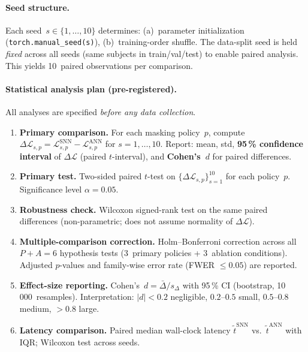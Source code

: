 \documentclass[11pt,a4paper]{article}
\begin{document}
\paragraph{Seed structure.}
Each seed~$s \in \{1, \dots, 10\}$ determines:
(a)~parameter initialization (\texttt{torch.manual\_seed(s)}),
(b)~training-order shuffle.
The data-split seed is held \emph{fixed} across all seeds
(same subjects in train/val/test) to enable paired analysis.
This yields 10~paired observations per comparison.

\paragraph{Statistical analysis plan (pre-registered).}
\label{par:stat-plan}
All analyses are specified \emph{before any data collection}.

\begin{enumerate}[nosep,label=\textbf{S\arabic*.}]
\item \textbf{Primary comparison.}
  For each masking policy~$p$, compute
  $\Delta\mathcal{L}_{s,p}
   = \mathcal{L}_{s,p}^{\text{SNN}} - \mathcal{L}_{s,p}^{\text{ANN}}$
  for $s = 1,\dots,10$.
  Report: mean, std, \textbf{95\,\% confidence interval} of
  $\Delta\mathcal{L}$ (paired $t$-interval), and
  \textbf{Cohen's~$d$} for paired differences.
\item \textbf{Primary test.}
  Two-sided paired $t$-test on $\{\Delta\mathcal{L}_{s,p}\}_{s=1}^{10}$
  for each policy~$p$.
  Significance level $\alpha = 0.05$.
\item \textbf{Robustness check.}
  Wilcoxon signed-rank test on the same paired differences
  (non-parametric; does not assume normality of $\Delta\mathcal{L}$).
\item \textbf{Multiple-comparison correction.}
  Holm--Bonferroni correction across all $P + A = 6$ hypothesis tests
  (3~primary policies + 3~ablation conditions).
  Adjusted $p$-values and family-wise error rate (FWER $\leq 0.05$)
  are reported.
\item \textbf{Effect-size reporting.}
  Cohen's~$d = \bar{\Delta} / s_{\Delta}$ with 95\,\% CI
  (bootstrap, 10\,000~resamples).
  Interpretation: $|d| < 0.2$ negligible, $0.2$--$0.5$ small,
  $0.5$--$0.8$ medium, $> 0.8$ large.
\item \textbf{Latency comparison.}
  Paired median wall-clock latency $\tilde{t}^{\text{SNN}}$ vs.\
  $\tilde{t}^{\text{ANN}}$ with IQR; Wilcoxon test across seeds.
\end{enumerate}
\end{document}
